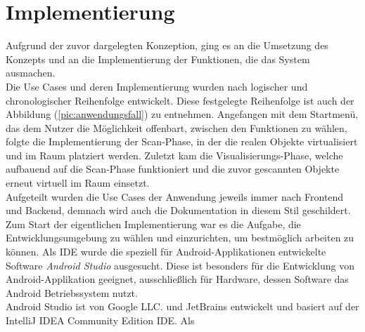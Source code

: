\section{Implementierung}
\label{chap:implementierung}
Aufgrund der zuvor dargelegten Konzeption, ging es an die Umsetzung des Konzepts und an die Implementierung der Funktionen, die das System ausmachen. 
\\ 
Die Use Cases und deren Implementierung wurden nach logischer und chronologischer Reihenfolge entwickelt. %
Diese festgelegte Reihenfolge 
ist auch der Abbildung (\ref{pic:anwendungsfall}) zu entnehmen. Angefangen mit dem Startmenü, das dem Nutzer die Möglichkeit offenbart, zwischen den Funktionen 
zu wählen, folgte die Implementierung der Scan-Phase, in der die realen Objekte virtualisiert und im Raum platziert werden. Zuletzt kam die Visualisierungs-Phase, 
welche aufbauend auf die Scan-Phase funktioniert und die zuvor gescannten Objekte erneut virtuell im Raum einsetzt. 
\\ 
\linebreak 
Aufgeteilt wurden die Use Cases der Anwendung jeweils immer nach Frontend und Backend, demnach wird auch die Dokumentation in diesem Stil geschildert. 
\\ 
\linebreak
Zum Start der eigentlichen Implementierung war es die Aufgabe, die Entwicklungsumgebung zu wählen und einzurichten, um bestmöglich arbeiten zu können. Als 
\ac{IDE} wurde die speziell für Android-Applikationen entwickelte Software \textit{Android Studio} ausgesucht. Diese ist besonders für die Entwicklung von 
Android-Applikation geeignet, ausschließlich für Hardware, dessen Software das Android Betriebssystem nutzt. 
\\
Android Studio ist von Google LLC. und JetBrains entwickelt und basiert auf der IntelliJ IDEA Community Edition \acs{IDE}. Als 
